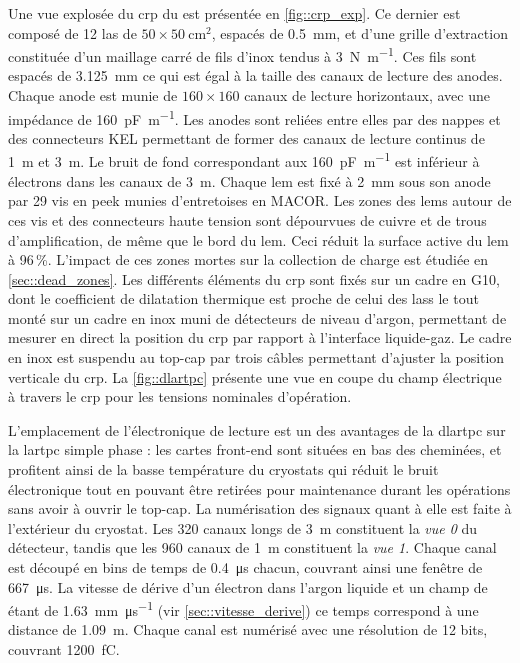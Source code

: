       Une vue explosée du \gls{crp} du \TOO{} est présentée en \autoref{fig::crp_exp}. Ce dernier est composé de 12 \gls{las} de $50\times\SI{50}{\centi\meter\squared}$,  espacés de \SI{0.5}{\milli\meter}, et d'une grille d'extraction constituée d'un maillage carré de fils d'inox tendus à \SI{3}{\newton\per\meter}. Ces fils sont espacés de \SI{3.125}{\milli\meter} ce qui est égal à la taille des canaux de lecture des anodes. Chaque anode est munie de $160\times160$ canaux de lecture horizontaux, avec une impédance de \SI{160}{\pico\farad\per\meter}. Les anodes sont reliées entre elles par des nappes et des connecteurs KEL permettant de former des canaux de lecture continus de \SI{1}{\meter} et \SI{3}{\meter}. Le bruit de fond correspondant aux \SI{160}{\pico\farad\per\meter} est inférieur à  électrons dans les canaux de \SI{3}{\meter}\cite{Aimard2018}. Chaque \gls{lem} est fixé à \SI{2}{\milli\meter} sous son anode par 29 vis en \gls{peek} munies d'entretoises en MACOR. Les zones des \glspl{lem} autour de ces vis et des connecteurs haute tension sont dépourvues de cuivre et de trous d'amplification, de même que le bord du \gls{lem}. Ceci réduit la surface active du \gls{lem} à 96\,\%. L'impact de ces zones mortes sur la collection de charge est étudiée en \autoref{sec::dead_zones}. Les différents éléments du \gls{crp} sont fixés sur un cadre en G10, dont le coefficient de dilatation thermique est proche de celui des \glspl{las} le tout monté sur un cadre en inox muni de détecteurs de niveau d'argon, permettant de mesurer en direct la position du \gls{crp} par rapport à l'interface liquide-gaz. Le cadre en inox est suspendu au top-cap par trois câbles permettant d'ajuster la position verticale du \gls{crp}. La \autoref{fig::dlartpc} présente une vue en coupe du champ électrique à travers le \gls{crp} pour les tensions nominales d'opération.

      L'emplacement de l'électronique de lecture est un des avantages de la \gls{dlartpc} sur la \gls{lartpc} simple phase : les cartes front-end sont situées en bas des cheminées, et profitent ainsi de la basse température du cryostats qui réduit le bruit électronique tout en pouvant être retirées pour maintenance durant les opérations sans avoir à ouvrir le top-cap. La numérisation des signaux quant à elle est faite à l'extérieur du cryostat. Les 320 canaux longs de \SI{3}{\meter} constituent la \textit{vue 0} du détecteur, tandis que les 960 canaux de \SI{1}{\meter} constituent la \textit{vue 1}. Chaque canal est découpé en  bins de temps de \SI{0.4}{\micro\second} chacun, couvrant ainsi une fenêtre de \SI{667}{\micro\second}. La vitesse de dérive d'un électron dans l'argon liquide et un champ de \driftfield{} étant de \SI{1.63}{\milli\meter\per\micro\second} (vir \autoref{sec::vitesse_derive}) ce temps correspond à une distance de \SI{1.09}{\meter}. Chaque canal est numérisé avec une résolution de 12 bits, couvrant \SI{1200}{\femto\coulomb}.

